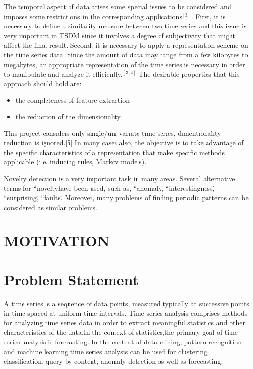 \documentclass[12pt,a4paper]{report}
\begin{document}
  The temporal aspect of data arises some special issues to be considered and imposes some restrictions in the corresponding applications$^{[3]}$. First, it is necessary to define a similarity measure between two time series and this issue is very important in TSDM since it involves a degree of subjectivity that might affect the final result. Second, it is necessary to apply a representation scheme on the time series data. Since the amount of data may range from a few kilobytes to megabytes, an appropriate representation of the time series is necessary in order to manipulate and analyze it efficiently.$^{[3,4]}$ The desirable properties that this approach should hold are: 
  \begin{itemize}
  \item the completeness of feature extraction 
  \item the reduction of the dimensionality. 
  \end{itemize}

This project  considers only single/uni-variate time series, dimentionality reduction is ignored.[5]
In many cases also, the objective is to take advantage of the specific characteristics of a representation that make specific methods applicable (i.e. inducing rules, Markov models). 

Novelty detection is a very important task in many areas. Several alternative terms for ``novelty\" have been used, such as, ``anomaly\", ``interestingness\", ``surprising\", ``faults\". Moreover, many problems of finding periodic patterns can be considered as similar problems.

\section{MOTIVATION}


\section{Problem Statement}
\paragraph{} A time series is a sequence of data points, measured typically at successive points in time spaced at uniform time intervals. Time series analysis comprises methods for analyzing time series data in order to extract meaningful statistics and other characteristics of the data.In the context of statistics,the primary goal of time series analysis is forecasting. In the context of data mining, pattern recognition and machine learning time series analysis can be used for clustering, classification, query by content, anomaly detection as well as forecasting.
\end{document}
